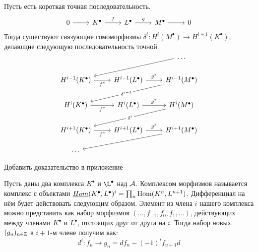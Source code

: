 \documentclass[../main.tex]{subfiles}
\begin{document}
\begin{to_suj}
Пусть есть короткая точная последовательность.
\begin{equation*}
    \begin{tikzcd}
	0 & {K^\bullet} & {L^\bullet} & {M^\bullet} & 0
	\arrow[from=1-1, to=1-2]
	\arrow["f", from=1-2, to=1-3]
	\arrow["g", from=1-3, to=1-4]
	\arrow[from=1-4, to=1-5]
\end{tikzcd}
\end{equation*}
Тогда существуют связующие гомоморфизмы $\delta^i: H^i(M^\bullet) \to H^{i+1}(K^\bullet)$, делающие следующую последовательность точной.
\begin{equation*}
    \begin{tikzcd}
	&& \ldots \\
	{H^{i-1}(K^\bullet)} & {H^{i-1}(L^\bullet)} & {H^{i-1}(M^\bullet)} \\
	{H^i(K^\bullet)} & {H^i(L^\bullet)} & {H^i(M^\bullet)} \\
	{H^{i+1}(K^\bullet)} & {H^{i+1}(L^\bullet)} & {H^{i+1}(M^\bullet)} \\
	\ldots
	\arrow[from=1-3, to=2-1]
	\arrow["{f^*}"', from=2-1, to=2-2]
	\arrow["{g^*}", from=2-2, to=2-3]
	\arrow["{\delta^{i-1}}"{description}, from=2-3, to=3-1]
	\arrow["{f^*}"', from=3-1, to=3-2]
	\arrow["{g^*}", from=3-2, to=3-3]
	\arrow["{\delta^i}"{description}, from=3-3, to=4-1]
	\arrow["{f^*}"', from=4-1, to=4-2]
	\arrow["{g^*}", from=4-2, to=4-3]
	\arrow[from=4-3, to=5-1]
\end{tikzcd}
\end{equation*}
\end{to_suj}
{\color{red}Добавить доказательство в приложение}
\begin{to_def}
\label{hHom}
Пусть даны два комплекса $K^\bullet$ и $\L^\bullet$ над $\mathcal{A}$. Комплексом морфизмов называется комплекс с объектами $\underline{Hom} (K^\bullet, L^\bullet)^i = \prod_n \operatorname{Hom}(K^n, L^{n+1})$. Дифференциал на нём будет действовать следующим образом. Элемент из члена $i$ нашего комплекса можно представить как набор морфизмов $(\ldots, f_{-1}, f_0, f_1, \ldots)$, действующих между членами $K^\bullet$ и $L^\bullet$, отстоящих друг от друга на $i$. Тогда набор новых $(g_n)_{n\in\mathbb{Z}}$ в $i+1$-м члене получим как:
\begin{equation*}
    d^i: f_n \to g_n = df_n - (-1)^if_{n+1}d
\end{equation*}
\end{to_def}
\end{document}
